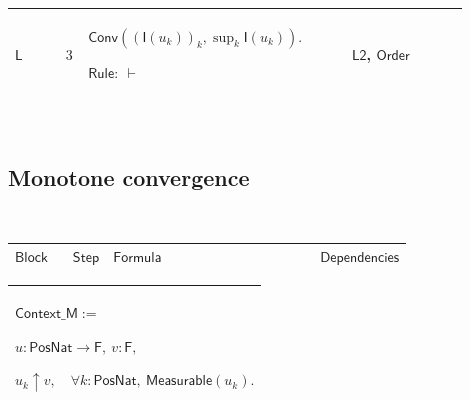 \documentclass[12pt,reqno]{amsart}
\theoremstyle{blueplain}
\numberwithin{equation}{section}
\newlength{\DCTOneColumnBody}
\begin{document}
{\scriptsize \setlength{\parskip}{0pt}\nointerlineskip
\noindent 
\begin{tabular}{|@{}>{\centering\arraybackslash}m{0.10658\linewidth}|>{\centering\arraybackslash}m{0.03553\linewidth}|>{\centering\arraybackslash}m{0.52105\linewidth}|>{\centering\arraybackslash}m{0.23684\linewidth}|}
\hline
\hypertarget{proof:L3}{$\displaystyle \mathsf{L}$} & $\displaystyle 3$ & $%
\displaystyle \mathsf{Conv}((\mathsf{I}(u_k))_k,\sup_k\mathsf{I}(u_k)).$\par$%
\displaystyle \mathsf{Rule}:\ \vdash$ & \hyperlink{proof:L2}{$\displaystyle 
\mathsf{L2}$}, \hyperlink{lem:Order}{$\displaystyle \mathsf{Order}$} \\ 
\hline
\end{tabular}%
}

{\scriptsize \ }

\subsection{\protect\scriptsize Monotone convergence}

{\scriptsize {\ }}

{\scriptsize \setlength{\parskip}{0pt}\nointerlineskip
\noindent 
\begin{tabular}{|@{}>{\centering\arraybackslash}m{\DCTOneColumnBody}|}
\hline
$\displaystyle \mathsf{MCTProof}$ \\ \hline
\end{tabular}%
}

{\scriptsize \setlength{\parskip}{0pt}\nointerlineskip
\noindent 
\begin{tabular}{|@{}>{\centering\arraybackslash}m{0.10658\linewidth}|>{\centering\arraybackslash}m{0.03553\linewidth}|>{\centering\arraybackslash}m{0.52105\linewidth}|>{\centering\arraybackslash}m{0.23684\linewidth}|}
\hline
$\displaystyle \mathsf{Block}$ & $\displaystyle \mathsf{Step}$ & $%
\displaystyle \mathsf{Formula}$ & $\displaystyle \mathsf{Dependencies}$ \\ 
\hline
\end{tabular}%
}

{\scriptsize \setlength{\parskip}{0pt}\nointerlineskip
\noindent 
\begin{tabular}{|@{}>{\centering\arraybackslash}m{\DCTOneColumnBody}|}
\hline
$\displaystyle \mathsf{Context\_M}:=$\par$\displaystyle u:\mathsf{PosNat}\to%
\mathsf{F},\ v:\mathsf{F},$\par$\displaystyle u_k\uparrow v,\quad\forall k:%
\mathsf{PosNat},\ \mathsf{Measurable}(u_k).$ \\ \hline
\end{tabular}%
}
\end{document}
